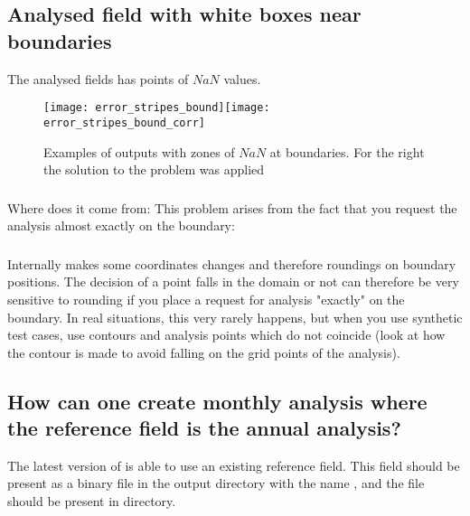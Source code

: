 \subsection{Analysed field with white boxes near boundaries}

The analysed fields has points of $NaN$ values.

\begin{figure}[htpb]
\centering
\texttt{[image: error\_stripes\_bound]}\texttt{[image: error\_stripes\_bound\_corr]}
\caption{Examples of \diva outputs with zones of $NaN$ at boundaries. For the right the solution to the problem was applied \label{fig:error_stripes}}
\end{figure}

\subsubsection{\question}
Where does it come from: This problem arises from the fact that you request the analysis almost exactly on the boundary: 



\subsubsection{\answer}
Internally \diva makes some coordinates changes and therefore roundings on boundary positions. The decision of a point falls in the domain or not can therefore be very sensitive
to rounding if you place a request for analysis "exactly" on the boundary. In real situations, this very rarely happens, but when you use synthetic test cases, use contours and analysis points which do not coincide (look at  how the contour is made to avoid falling on the grid points of the analysis).




\subsection{How can one create monthly analysis where the reference field is the annual analysis?}

The latest version of  is able to use an existing reference field. This field should be present as a binary file in the output directory with the name , and the  file should be present in  directory.

